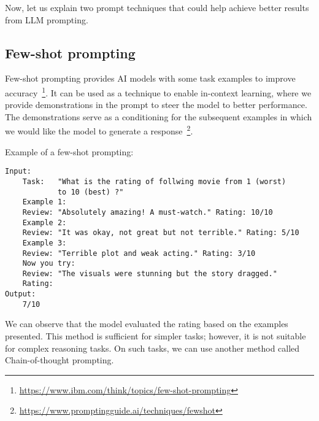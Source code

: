 Now, let us explain two prompt techniques that could help achieve better results from LLM prompting.

\subsection*{Few-shot prompting}
Few-shot prompting provides AI models with some task examples to improve accuracy~\footnote{\url{https://www.ibm.com/think/topics/few-shot-prompting}}. It can be used as a technique to enable in-context learning, where we provide demonstrations in the prompt to steer the model to better performance. The demonstrations serve as a conditioning for the subsequent examples in which we would like the model to generate a response~\footnote{\url{https://www.promptingguide.ai/techniques/fewshot}}.

Example of a few-shot prompting:
\begin{verbatim}
Input:
    Task:   "What is the rating of follwing movie from 1 (worst)
            to 10 (best) ?" 
    Example 1:
    Review: "Absolutely amazing! A must-watch." Rating: 10/10
    Example 2:
    Review: "It was okay, not great but not terrible." Rating: 5/10
    Example 3:
    Review: "Terrible plot and weak acting." Rating: 3/10
    Now you try:
    Review: "The visuals were stunning but the story dragged."
    Rating:
Output:
    7/10
\end{verbatim}

We can observe that the model evaluated the rating based on the examples presented. This method is sufficient for simpler tasks; however, it is not suitable for complex reasoning tasks. On such tasks, we can use another method called Chain-of-thought prompting.

